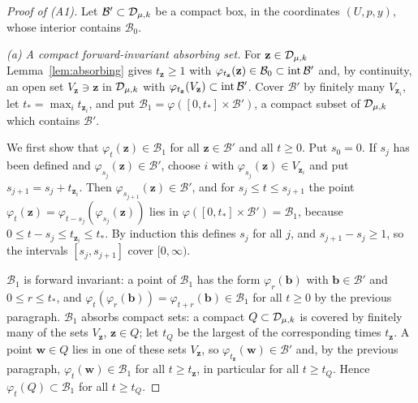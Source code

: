 \begin{proof}[Proof of (A1)]
Let $\mathcal B'\subset\mathcal D_{\mu,k}$ be a compact box, in the coordinates $(U,p,y)$, whose interior contains $\mathcal B_0$.

\emph{(a) A compact forward-invariant absorbing set.} For $\mathbf z\in\mathcal D_{\mu,k}$ Lemma~\ref{lem:absorbing} gives $t_{\mathbf z}\ge1$ with $\varphi_{t_{\mathbf z}}(\mathbf z)\in\mathcal B_0\subset\operatorname{int}\mathcal B'$ and, by continuity, an open set $V_{\mathbf z}\ni\mathbf z$ in $\mathcal D_{\mu,k}$ with $\varphi_{t_{\mathbf z}}(V_{\mathbf z})\subset\operatorname{int}\mathcal B'$. Cover $\mathcal B'$ by finitely many $V_{\mathbf z_i}$, let $t_\ast=\max_it_{\mathbf z_i}$, and put $\mathcal B_1=\varphi([0,t_\ast]\times\mathcal B')$, a compact subset of $\mathcal D_{\mu,k}$ which contains $\mathcal B'$.

We first show that $\varphi_t(\mathbf z)\in\mathcal B_1$ for all $\mathbf z\in\mathcal B'$ and all $t\ge0$. Put $s_0=0$. If $s_j$ has been defined and $\varphi_{s_j}(\mathbf z)\in\mathcal B'$, choose $i$ with $\varphi_{s_j}(\mathbf z)\in V_{\mathbf z_i}$ and put $s_{j+1}=s_j+t_{\mathbf z_i}$. Then $\varphi_{s_{j+1}}(\mathbf z)\in\mathcal B'$, and for $s_j\le t\le s_{j+1}$ the point $\varphi_t(\mathbf z)=\varphi_{t-s_j}(\varphi_{s_j}(\mathbf z))$ lies in $\varphi([0,t_\ast]\times\mathcal B')=\mathcal B_1$, because $0\le t-s_j\le t_{\mathbf z_i}\le t_\ast$. By induction this defines $s_j$ for all $j$, and $s_{j+1}-s_j\ge1$, so the intervals $[s_j,s_{j+1}]$ cover $[0,\infty)$.

$\mathcal B_1$ is forward invariant: a point of $\mathcal B_1$ has the form $\varphi_r(\mathbf b)$ with $\mathbf b\in\mathcal B'$ and $0\le r\le t_\ast$, and $\varphi_t(\varphi_r(\mathbf b))=\varphi_{t+r}(\mathbf b)\in\mathcal B_1$ for all $t\ge0$ by the previous paragraph. $\mathcal B_1$ absorbs compact sets: a compact $Q\subset\mathcal D_{\mu,k}$ is covered by finitely many of the sets $V_{\mathbf z}$, $\mathbf z\in Q$; let $t_Q$ be the largest of the corresponding times $t_{\mathbf z}$. A point $\mathbf w\in Q$ lies in one of these sets $V_{\mathbf z}$, so $\varphi_{t_{\mathbf z}}(\mathbf w)\in\mathcal B'$ and, by the previous paragraph, $\varphi_t(\mathbf w)\in\mathcal B_1$ for all $t\ge t_{\mathbf z}$, in particular for all $t\ge t_Q$. Hence $\varphi_t(Q)\subset\mathcal B_1$ for all $t\ge t_Q$.


\end{proof}
